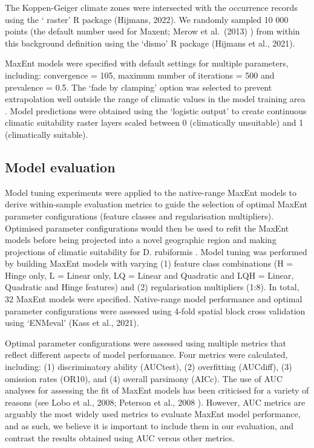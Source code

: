 \documentclass[
  authoryear,
  preprint,
  3p,
  onecolumn]{elsarticle}
\begin{document}
The Koppen-Geiger climate zones were intersected with the occurrence
records using the ` raster' R package (Hijmans, 2022). We randomly
sampled 10 000 points (the default number used for Maxent; Merow et
al.~(2013) ) from within this background definition using the `dismo' R
package (Hijmans et al., 2021).

MaxEnt models were specified with default settings for multiple
parameters, including: convergence = 105, maximum number of iterations =
500 and prevalence = 0.5. The `fade by clamping' option was selected to
prevent extrapolation well outside the range of climatic values in the
model training area \citep{Phillips2017}. Model predictions were
obtained using the `logistic output' to create continuous climatic
suitability raster layers scaled between 0 (climatically unsuitable) and
1 (climatically suitable).

\hypertarget{model-evaluation}{%
\subsection{Model evaluation}\label{model-evaluation}}

Model tuning experiments were applied to the native-range MaxEnt models
to derive within-sample evaluation metrics to guide the selection of
optimal MaxEnt parameter configurations (feature classes and
regularisation multipliers). Optimised parameter configurations would
then be used to refit the MaxEnt models before being projected into a
novel geographic region and making projections of climatic suitability
for D. rubiformis . Model tuning was performed by building MaxEnt models
with varying (1) feature class combinations (H = Hinge only, L = Linear
only, LQ = Linear and Quadratic and LQH = Linear, Quadratic and Hinge
features) and (2) regularisation multipliers (1:8). In total, 32 MaxEnt
models were specified. Native-range model performance and optimal
parameter configurations were assessed using 4-fold spatial block cross
validation using `ENMeval' (Kass et al., 2021).

Optimal parameter configurations were assessed using multiple metrics
that reflect different aspects of model performance. Four metrics were
calculated, including: (1) discriminatory ability (AUCtest), (2)
overfitting (AUCdiff), (3) omission rates (OR10), and (4) overall
parsimony (AICc). The use of AUC analyses for assessing the fit of
MaxEnt models has been criticised for a variety of reasons (see Lobo et
al., 2008; Peterson et al., 2008 ). However, AUC metrics are arguably
the most widely used metrics to evaluate MaxEnt model performance, and
as such, we believe it is important to include them in our evaluation,
and contrast the results obtained using AUC versus other metrics.
\end{document}

